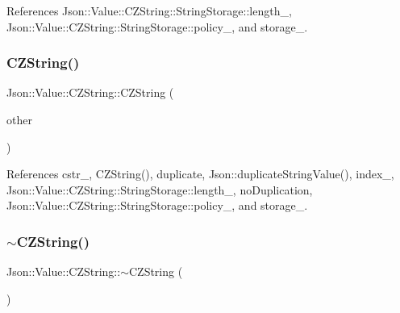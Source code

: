References Json\+::\+Value\+::\+C\+Z\+String\+::\+String\+Storage\+::length\+\_\+, Json\+::\+Value\+::\+C\+Z\+String\+::\+String\+Storage\+::policy\+\_\+, and storage\+\_\+.

\mbox{\label{classJson_1_1Value_1_1CZString_a9685070d440335b55ef5c85747d25157_a9685070d440335b55ef5c85747d25157}} 
\subsubsection{\texorpdfstring{C\+Z\+String()}{CZString()}\hspace{0.1cm}{\footnotesize\ttfamily [3/3]}}
{\footnotesize\ttfamily Json\+::\+Value\+::\+C\+Z\+String\+::\+C\+Z\+String (\begin{DoxyParamCaption}\item[{\hyperlink{classJson_1_1Value_1_1CZString}{C\+Z\+String} const \&}]{other }\end{DoxyParamCaption})}



References cstr\+\_\+, C\+Z\+String(), duplicate, Json\+::duplicate\+String\+Value(), index\+\_\+, Json\+::\+Value\+::\+C\+Z\+String\+::\+String\+Storage\+::length\+\_\+, no\+Duplication, Json\+::\+Value\+::\+C\+Z\+String\+::\+String\+Storage\+::policy\+\_\+, and storage\+\_\+.

\mbox{\label{classJson_1_1Value_1_1CZString_add6989dc7073646b95e5ebacb3f07d51_add6989dc7073646b95e5ebacb3f07d51}} 
\subsubsection{\texorpdfstring{$\sim$\+C\+Z\+String()}{~CZString()}}
{\footnotesize\ttfamily Json\+::\+Value\+::\+C\+Z\+String\+::$\sim$\+C\+Z\+String (\begin{DoxyParamCaption}{ }\end{DoxyParamCaption})}



